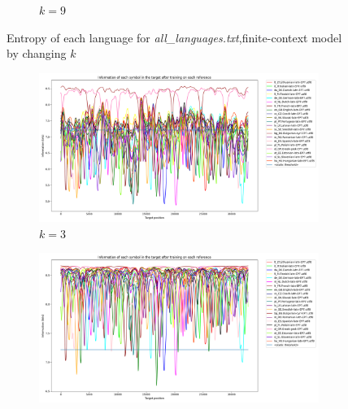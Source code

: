\documentclass{article}
\begin{document}
\begin{figure}
\begin{subfigure}[b]{0.3\textwidth}
\begin{center}
        \end{center}
        \caption{$k = 9$}
        \label{fig:all_languages_p_c:1:9}
    \end{subfigure}
    
    \caption{Entropy of each language for \textit{all\_languages.txt},finite-context model by changing $k$}
    \label{fig:all_languages_p_c}
\end{figure}

\begin{figure}
    \begin{subfigure}[b]{0.3\textwidth}
        \begin{center}
            \includegraphics[width=1.0\linewidth]{../results/all_languages_random/-p_c:1:3.png}
        \end{center}
        \caption{$k = 3$}
        \label{fig:all_languages_random_p_c:1:3}
    \end{subfigure}
    \hfill
    \begin{subfigure}[b]{0.3\textwidth}
        \begin{center}
            \includegraphics[width=1.0\linewidth]{../results/all_languages_random/-p_c:1:6.png}
        \end{center}

\end{subfigure}
\end{figure}
\end{document}
